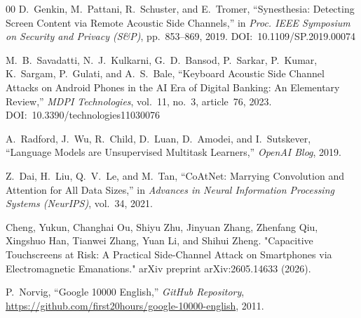 \documentclass[conference]{IEEEtran}
\begin{document}
\begin{thebibliography}{00}
D.~Genkin, M.~Pattani, R.~Schuster, and E.~Tromer,
``Synesthesia: Detecting Screen Content via Remote Acoustic Side
Channels,''
in \textit{Proc. IEEE Symposium on Security and Privacy (S\&P)},
pp.~853--869, 2019.
DOI:~10.1109/SP.2019.00074

M.~B.~Savadatti, N.~J.~Kulkarni, G.~D.~Bansod, P.~Sarkar,
P.~Kumar, K.~Sargam, P.~Gulati, and A.~S.~Bale,
``Keyboard Acoustic Side Channel Attacks on Android Phones in the
AI Era of Digital Banking: An Elementary Review,''
\textit{MDPI Technologies},
vol.~11, no.~3, article~76, 2023.
DOI:~10.3390/technologies11030076

A.~Radford, J.~Wu, R.~Child, D.~Luan, D.~Amodei, and I.~Sutskever,
``Language Models are Unsupervised Multitask Learners,''
\textit{OpenAI Blog}, 2019.

Z.~Dai, H.~Liu, Q.~V.~Le, and M.~Tan,
``CoAtNet: Marrying Convolution and Attention for All Data Sizes,''
in \textit{Advances in Neural Information Processing Systems
(NeurIPS)},
vol.~34, 2021.

 Cheng, Yukun, Changhai Ou, Shiyu Zhu, Jinyuan Zhang, Zhenfang Qiu, Xingshuo Han, Tianwei Zhang, Yuan Li, and Shihui Zheng. "Capacitive Touchscreens at Risk: A Practical Side-Channel Attack on Smartphones via Electromagnetic Emanations." arXiv preprint arXiv:2605.14633 (2026).

P.~Norvig,
``Google 10000 English,''
\textit{GitHub Repository},
\url{https://github.com/first20hours/google-10000-english},
2011.



\end{thebibliography}
\end{document}
